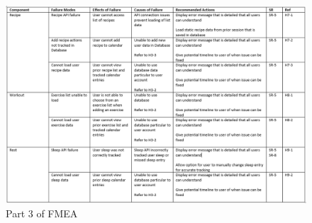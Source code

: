 \documentclass{article}
\begin{document}
\begin{landscape}
	\begin{figure}[ht]
		\centering
		\includegraphics[angle=360, scale=0.75]{FMEA_Part3.png}
		\caption{Part 3 of FMEA}
	\end{figure}
\end{landscape}
\end{document}
